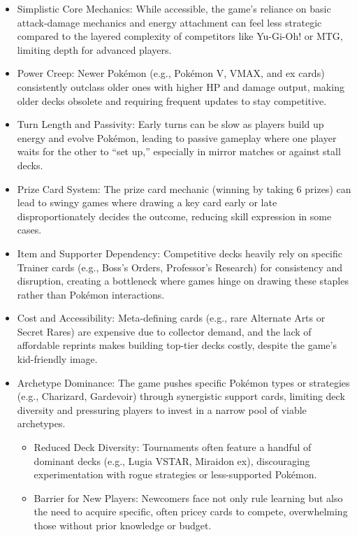 \begin{itemize}
\item Simplistic Core Mechanics: While accessible, the game’s reliance on basic attack-damage mechanics and energy attachment can feel less strategic compared to the layered complexity of competitors like Yu-Gi-Oh! or MTG, limiting depth for advanced players.
\item Power Creep: Newer Pokémon (e.g., Pokémon V, VMAX, and ex cards) consistently outclass older ones with higher HP and damage output, making older decks obsolete and requiring frequent updates to stay competitive.
\item Turn Length and Passivity: Early turns can be slow as players build up energy and evolve Pokémon, leading to passive gameplay where one player waits for the other to “set up,” especially in mirror matches or against stall decks.
\item Prize Card System: The prize card mechanic (winning by taking 6 prizes) can lead to swingy games where drawing a key card early or late disproportionately decides the outcome, reducing skill expression in some cases.
\item Item and Supporter Dependency: Competitive decks heavily rely on specific Trainer cards (e.g., Boss’s Orders, Professor’s Research) for consistency and disruption, creating a bottleneck where games hinge on drawing these staples rather than Pokémon interactions.
\item Cost and Accessibility: Meta-defining cards (e.g., rare Alternate Arts or Secret Rares) are expensive due to collector demand, and the lack of affordable reprints makes building top-tier decks costly, despite the game’s kid-friendly image.
\item Archetype Dominance: The game pushes specific Pokémon types or strategies (e.g., Charizard, Gardevoir) through synergistic support cards, limiting deck diversity and pressuring players to invest in a narrow pool of viable archetypes.
	\begin{itemize}
		\item Reduced Deck Diversity: Tournaments often feature a handful of dominant decks (e.g., Lugia VSTAR, Miraidon ex), discouraging experimentation with rogue strategies or less-supported Pokémon.
		\item Barrier for New Players: Newcomers face not only rule learning but also the need to acquire specific, often pricey cards to compete, overwhelming those without prior knowledge or budget.
	\end{itemize}

\end{itemize}
